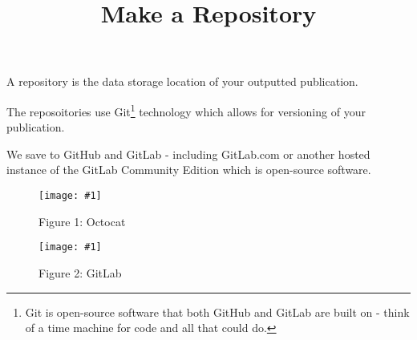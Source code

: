 \documentclass{article}
\newlength{\imgwidth}
\newcommand\scaledgraphics[2]{%
                
\settowidth{\imgwidth}{\texttt{[image: \#1]}}%
                
\setlength{\imgwidth}{\minof{\imgwidth}{#2\textwidth}}%
                
\texttt{[image: \#1]}%
                
}
\begin{document}
\title{Make a Repository}

\maketitle


A repository is the data storage location of your outputted publication.


The reposoitories use Git\footnote{Git is open-source software that both GitHub and GitLab are built on - think of a time machine for code and all that could do.} technology which allows for versioning of your publication.


We save to GitHub and GitLab\autocite{PerkelJeffrey2016} - including GitLab.com or another hosted instance of the GitLab Community Edition which is open-source software.

\begin{figure}
\scaledgraphics{d095295c-b3e6-4e52-be14-226bdafee26e.png}{0.5}
\caption*{Figure 1: Octocat}\label{F44428261}
\end{figure}

\begin{figure}
\scaledgraphics{f729a128-33fa-4ec4-92b1-bf0eade111b9.jpg}{0.5}
\caption*{Figure 2: GitLab}\label{F8019541}
\end{figure}


\printbibliography[title={Bibliography}]
\end{document}
